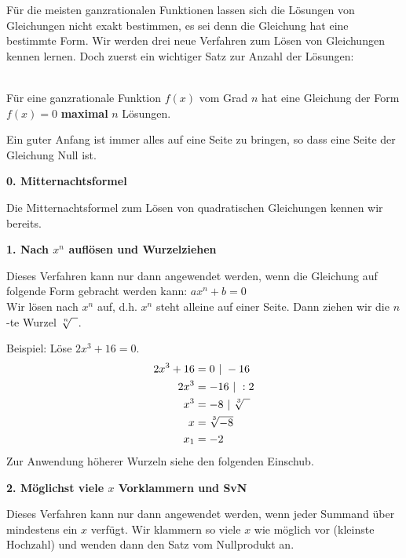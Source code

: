 Für die meisten ganzrationalen Funktionen lassen sich die Lösungen von Gleichungen nicht exakt bestimmen, es sei denn die Gleichung hat eine bestimmte Form. Wir werden drei neue Verfahren zum Lösen von Gleichungen kennen lernen. Doch zuerst ein wichtiger Satz zur Anzahl der Lösungen:

\begin{tcolorbox}\centering
	\textcolor{loestc}{\vspace{0.3cm}\\Für eine ganzrationale Funktion \(f(x)\) vom Grad \(n\) hat eine Gleichung der Form \(f(x)=0\) \textbf{maximal} \(n\) Lösungen.\\ \vspace{0.5cm}}
\end{tcolorbox}

Ein guter Anfang ist immer alles auf eine Seite zu bringen, so dass eine Seite der Gleichung Null ist. 

\textbf{0. Mitternachtsformel}

Die Mitternachtsformel zum Lösen von quadratischen Gleichungen kennen wir bereits.

\textbf{1. Nach \(x^n\) auflösen und Wurzelziehen}

Dieses Verfahren kann nur dann angewendet werden, wenn die Gleichung auf folgende Form gebracht werden kann: \(ax^n+b=0\)\\
Wir lösen nach \(x^n\) auf, d.h. \(x^n\) steht alleine auf einer Seite. Dann ziehen wir die \(n\)-te Wurzel \(\sqrt[\leftroot{0}\uproot{2}n]{\phantom{x}}\).

Beispiel: Löse \(2x^3+16=0\).
{\large\textcolor{loes}{\begin{align*}
		2x^3+16&=0\ \vert\ -16\\
		2x^3&=-16\ \vert\ :2\\
		x^3&=-8\ \vert\ \sqrt[\leftroot{0}\uproot{2}3]{\phantom{x}}\\
		x&=\sqrt[\leftroot{0}\uproot{2}3]{-8}\\
		x_1&=-2
\end{align*}}}
Zur Anwendung höherer Wurzeln siehe den folgenden Einschub.

\textbf{2. Möglichst viele \(x\) Vorklammern und SvN}

Dieses Verfahren kann nur dann angewendet werden, wenn jeder Summand über mindestens ein \(x\) verfügt. Wir klammern so viele \(x\) wie möglich vor (kleinste Hochzahl) und wenden dann den Satz vom Nullprodukt an.

